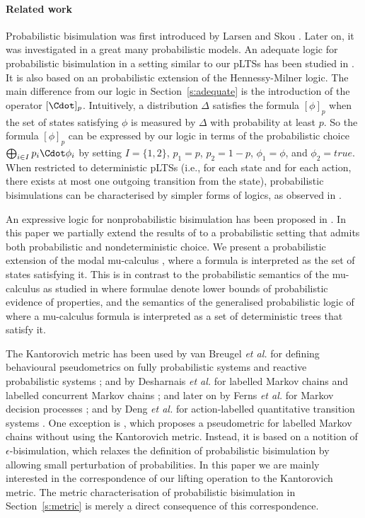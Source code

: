 \documentclass{article}
\begin{document}
\paragraph{Related work}
Probabilistic bisimulation was first introduced by Larsen and Skou
\cite{LS91}. Later on, it was investigated in a great many
probabilistic models.
An adequate logic for probabilistic bisimulation in a setting similar to our pLTSs has
been studied in \cite{JWL01,PS07}. It is also based on an probabilistic
extension of the Hennessy-Milner logic. The main difference from our
logic in Section~\ref{s:adequate} is the introduction of the
operator $[\Cdot ]_p$. Intuitively, a distribution $\Delta$
satisfies the formula $[\phi]_p$ when the set of states satisfying
$\phi$ is measured by $\Delta$ with probability at least $p$. So the
formula $[\phi]_p$ can be expressed by our logic in terms of the
probabilistic choice $\bigoplus_{i\in I}p_i\Cdot\phi_i$ by setting
$I=\{1,2\}$, $p_1=p$, $p_2=1-p$, $\phi_1=\phi$, and $\phi_2=true$.
When restricted to
deterministic pLTSs (i.e., for each state and for each action, there
exists at most one outgoing transition from the state),
probabilistic bisimulations can be characterised by simpler forms of
logics, as observed in \cite{LS91,DEP98,PS07}.

An expressive logic for nonprobabilistic bisimulation has been proposed in \cite{SI94}.
 In this paper we partially extend the results of
\cite{SI94} to a probabilistic setting that admits both
probabilistic and nondeterministic choice. We present a
probabilistic extension of the modal mu-calculus \cite{Koz83}, where
a formula is interpreted as the set of states satisfying it. This is
in contrast to the probabilistic semantics of the mu-calculus as
studied in
 \cite{HK97,MM97,MM07} where formulae denote lower bounds of
probabilistic evidence of properties, and the semantics of the
generalised probabilistic logic of \cite{CIN05} where a mu-calculus
formula is interpreted as a set of deterministic trees that satisfy
it.

The Kantorovich metric has been used by van Breugel \emph{et al.}
for defining behavioural pseudometrics on fully probabilistic
systems \cite{BW01,BW06,BSW07} and reactive probabilistic systems
\cite{BW01b,BW05,BHMW05,BHMW07}; and by Desharnais {\em et al.} for
labelled Markov chains \cite{DGJP99,DGJP04} and labelled concurrent
Markov chains \cite{DGJP02}; and later on by Ferns \emph{et al.} for
Markov decision processes \cite{FPP04,FPP05}; and by Deng \emph{et
al.} for action-labelled quantitative transition systems
\cite{DCPP05}.  One exception is \cite{DLT08}, which proposes a
pseudometric for labelled Markov chains without using the Kantorovich
metric.  Instead, it is based on a notition of $\epsilon$-bisimulation, which
relaxes the definition of probabilistic bisimulation by allowing small
perturbation of probabilities.
In this paper we are mainly interested in the
correspondence of our lifting operation to the Kantorovich metric.
The metric characterisation of probabilistic bisimulation in
Section~\ref{s:metric} is merely a direct consequence of this
correspondence.
\end{document}
